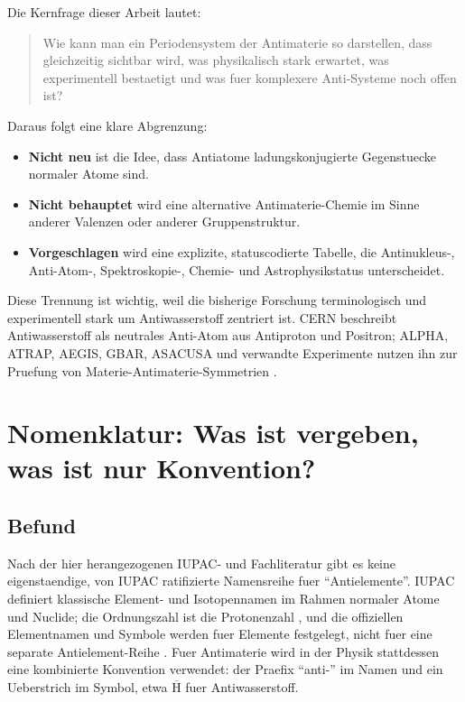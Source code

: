 \documentclass[11pt,a4paper]{article}
\newcommand{\anti}[1]{\ensuremath{\overline{\mathrm{#1}}}}
\begin{document}
Die Kernfrage dieser Arbeit lautet:

\begin{quote}
Wie kann man ein Periodensystem der Antimaterie so darstellen, dass gleichzeitig sichtbar wird, was physikalisch stark erwartet, was experimentell bestaetigt und was fuer komplexere Anti-Systeme noch offen ist?
\end{quote}

Daraus folgt eine klare Abgrenzung:

\begin{itemize}
  \item \textbf{Nicht neu} ist die Idee, dass Antiatome ladungskonjugierte Gegenstuecke normaler Atome sind.
  \item \textbf{Nicht behauptet} wird eine alternative Antimaterie-Chemie im Sinne anderer Valenzen oder anderer Gruppenstruktur.
  \item \textbf{Vorgeschlagen} wird eine explizite, statuscodierte Tabelle, die Antinukleus-, Anti-Atom-, Spektroskopie-, Chemie- und Astrophysikstatus unterscheidet.
\end{itemize}

Diese Trennung ist wichtig, weil die bisherige Forschung terminologisch und experimentell stark um Antiwasserstoff zentriert ist. CERN beschreibt Antiwasserstoff als neutrales Anti-Atom aus Antiproton und Positron; ALPHA, ATRAP, AEGIS, GBAR, ASACUSA und verwandte Experimente nutzen ihn zur Pruefung von Materie-Antimaterie-Symmetrien \cite{CERNstoring,CERNantimatter}.

\section{Nomenklatur: Was ist vergeben, was ist nur Konvention?}

\subsection{Befund}

Nach der hier herangezogenen IUPAC- und Fachliteratur gibt es keine eigenstaendige, von IUPAC ratifizierte Namensreihe fuer \enquote{Antielemente}. IUPAC definiert klassische Element- und Isotopennamen im Rahmen normaler Atome und Nuclide; die Ordnungszahl ist die Protonenzahl \cite{IUPACatomicnumber}, und die offiziellen Elementnamen und Symbole werden fuer Elemente festgelegt, nicht fuer eine separate Antielement-Reihe \cite{IUPAC113118}. Fuer Antimaterie wird in der Physik stattdessen eine kombinierte Konvention verwendet: der Praefix \enquote{anti-} im Namen und ein Ueberstrich im Symbol, etwa \anti{H} fuer Antiwasserstoff.
\end{document}
